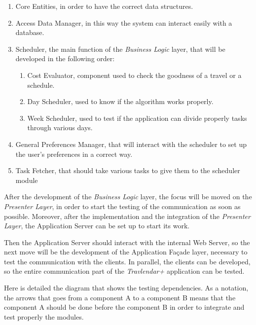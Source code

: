 \begin{enumerate}
    \item Core Entities, in order to have the correct data structures.
    \item Access Data Manager, in this way the system can interact easily with a database.
    \item Scheduler, the main function of the \emph{Business Logic} layer, that will be developed in the following order:
    \begin{enumerate}
        \item Cost Evaluator, component used to check the goodness of a travel or a schedule.
        \item Day Scheduler, used to know if the algorithm works properly.
        \item Week Scheduler, used to test if the application can divide properly tasks through various days.
    \end{enumerate}
    \item General Preferences Manager, that will interact with the scheduler to set up the user's preferences in a correct way.
    \item Task Fetcher, that should take various tasks to give them to the scheduler module
\end{enumerate}

After the development of the \emph{Business Logic} layer, the focus will be moved on the \emph{Presenter Layer}, in order to start the testing of the communication as soon as possible. Moreover, after the implementation and the integration of the \emph{Presenter Layer}, the Application Server can be set up to start its work.

Then the Application Server should interact with the internal Web Server, so the next move will be the development of the Application Façade layer, necessary to test the communication with the clients.
In parallel, the clients can be developed, so the entire communication part of the \emph{Travlendar+} application can be tested.

Here is detailed the diagram that shows the testing dependencies. As a notation, the arrows that goes from a component A to a component B means that the component A should be done before the component B in order to integrate and test properly the modules.

